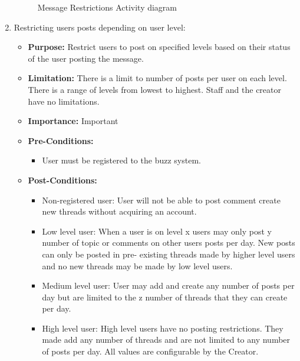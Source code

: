 \documentclass[11pt]{article}
\begin{document}
\begin{enumerate}
\begin{figure}[H]
\begin{center}
		\end{center}    	
    	\caption{Message Restrictions Activity diagram}
	\end{figure}
\newpage

\item  Restricting users posts depending on user level:
\begin{itemize}	
		\item \textbf{Purpose:} Restrict users to post on specified levels based on their status of the user posting the message.
		\item\textbf{Limitation: }There is a limit to number of posts per user on each level.
		 There is a range of levels from lowest to highest.
		 Staff and the creator have no limitations.
		\item\textbf{Importance:} Important

		\item\textbf{Pre-Conditions: }
		\begin{itemize}
			 \item User must be registered to the buzz system.
		 \end{itemize}
		 
		\item\textbf{Post-Conditions: }
		\begin{itemize}
			\item Non-registered user:
			User will not be able to post comment create new threads without acquiring an account.
			\item Low level user:
			When a user is on level x users may only post y number of topic or comments on other users posts per day. New posts can only be posted in pre-		existing threads made by higher level users and no new threads may be made by low level users. 
			\item Medium level user:
			User may add and create any number of posts per day but are limited to the z number of threads that they can create per day.
			\item High level user:
			High level users have no posting restrictions. They made add any number of threads and are not limited to any number of posts per day.
		 	All values are configurable by the Creator.
		 \end{itemize}


\end{itemize}
\end{enumerate}
\end{document}
